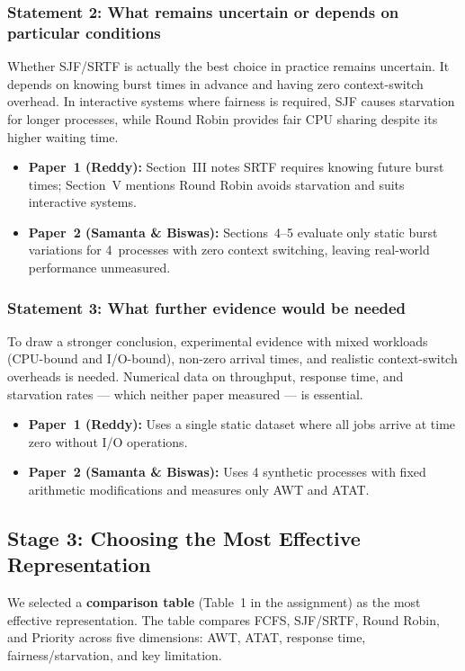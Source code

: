 \documentclass[11pt, a4paper]{article}
\begin{document}
\subsubsection*{Statement 2: What remains uncertain or depends on particular conditions}
Whether SJF/SRTF is actually the best choice in practice remains uncertain. It depends on knowing burst times in advance and having zero context-switch overhead. In interactive systems where fairness is required, SJF causes starvation for longer processes, while Round Robin provides fair CPU sharing despite its higher waiting time.
\begin{itemize}[nosep]
    \item \textbf{Paper~1 (Reddy):} Section~III notes SRTF requires knowing future burst times; Section~V mentions Round Robin avoids starvation and suits interactive systems.
    \item \textbf{Paper~2 (Samanta \& Biswas):} Sections~4--5 evaluate only static burst variations for 4~processes with zero context switching, leaving real-world performance unmeasured.
\end{itemize}

\subsubsection*{Statement 3: What further evidence would be needed}
To draw a stronger conclusion, experimental evidence with mixed workloads (CPU-bound and I/O-bound), non-zero arrival times, and realistic context-switch overheads is needed. Numerical data on throughput, response time, and starvation rates --- which neither paper measured --- is essential.
\begin{itemize}[nosep]
    \item \textbf{Paper~1 (Reddy):} Uses a single static dataset where all jobs arrive at time zero without I/O operations.
    \item \textbf{Paper~2 (Samanta \& Biswas):} Uses 4 synthetic processes with fixed arithmetic modifications and measures only AWT and ATAT.
\end{itemize}

\subsection{Stage 3: Choosing the Most Effective Representation}
We selected a \textbf{comparison table} (Table~1 in the assignment) as the most effective representation. The table compares FCFS, SJF/SRTF, Round Robin, and Priority across five dimensions: AWT, ATAT, response time, fairness/starvation, and key limitation.
\end{document}
